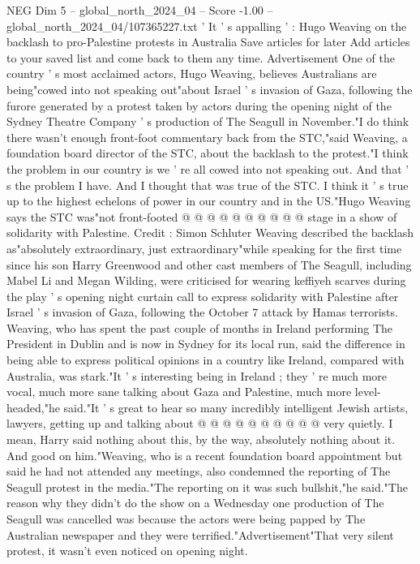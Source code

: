 \begin{textsample}{NEG Dim 5 – global\_north\_2024\_04 – Score -1.00 – global\_north\_2024\_04/107365227.txt}  \label{ex:f5_neg_196}
' It ' s appalling ' : Hugo Weaving on the backlash to pro-Palestine protests in Australia Save articles for later Add articles to your saved list and come back to them any time.
Advertisement One of the country ' s most acclaimed actors, Hugo Weaving, believes Australians are being"cowed into not speaking out"about Israel ' s invasion of Gaza, following the furore generated by a protest taken by actors during the opening night of the Sydney Theatre Company ' s production of The Seagull in November."I do think there wasn't enough front-foot commentary back from the STC,"said Weaving, a foundation board director of the STC, about the backlash to the protest."I think the problem in our country is we ' re all cowed into not speaking out.
And that ' s the problem I have.
And I thought that was true of the STC.
I think it ' s true up to the highest echelons of power in our country and in the US."Hugo Weaving says the STC was"not front-footed @ @ @ @ @ @ @ @ @ @ stage in a show of solidarity with Palestine.
Credit : Simon Schluter Weaving described the backlash as"absolutely extraordinary, just extraordinary"while speaking for the first time since his son Harry Greenwood and other cast members of The Seagull, including Mabel Li and Megan Wilding, were criticised for wearing keffiyeh scarves during the play ' s opening night curtain call to express solidarity with Palestine after Israel ' s invasion of Gaza, following the October 7 attack by Hamas terrorists.
Weaving, who has spent the past couple of months in Ireland performing The President in Dublin and is now in Sydney for its local run, said the difference in being able to express political opinions in a country like Ireland, compared with Australia, was stark."It ' s interesting being in Ireland ; they ' re much more vocal, much more sane talking about Gaza and Palestine, much more level-headed,"he said."It ' s great to hear so many incredibly intelligent Jewish artists, lawyers, getting up and talking about @ @ @ @ @ @ @ @ @ @ very quietly.
I mean, Harry said nothing about this, by the way, absolutely nothing about it.
And good on him."Weaving, who is a recent foundation board appointment but said he had not attended any meetings, also condemned the reporting of The Seagull protest in the media."The reporting on it was such bullshit,"he said."The reason why they didn't do the show on a Wednesday one production of The Seagull was cancelled was because the actors were being papped by The Australian newspaper and they were terrified."Advertisement"That very silent protest, it wasn't even noticed on opening night.

\end{textsample}

